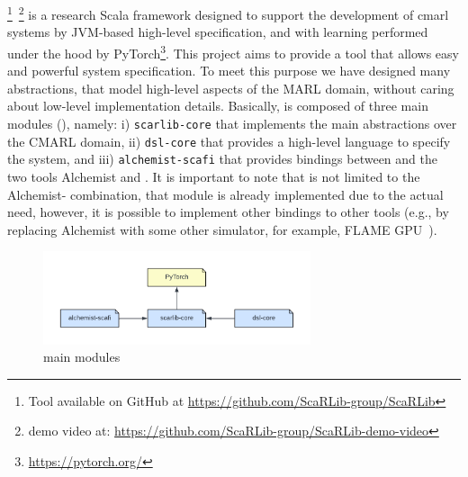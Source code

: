 \section{\scarlib{}}\label{contribution}

\scarlib{} \footnote{Tool available on GitHub at \url{https://github.com/ScaRLib-group/ScaRLib}}~\footnote{demo video at: \url{https://github.com/ScaRLib-group/ScaRLib-demo-video}} is a research Scala framework designed to support
the development of \ac{cmarl} systems by JVM-based high-level specification, and with learning performed under the hood by PyTorch\footnote{\url{https://pytorch.org/}}.
%
This project aims to provide a tool that allows easy and powerful system specification.
%
To meet this purpose we have designed many abstractions, that model high-level aspects of the MARL domain, 
 without caring about low-level implementation details.
Basically, \scarlib{} is composed of three main modules (), namely: 
    i) \texttt{scarlib-core} that implements the main abstractions over the CMARL domain,
    ii) \texttt{dsl-core} that provides a high-level language to specify the system, and
    iii) \texttt{alchemist-scafi} that provides bindings between \scarlib{} and the two tools Alchemist and \scafi{}.
    It is important to note that \scarlib{} is not limited to the Alchemist-\scafi{} combination, that module is 
    already implemented due to the actual need, however, it is possible to implement other bindings to other tools
    (e.g., by replacing Alchemist with some other simulator, for example, FLAME GPU~\cite{flame}).
\begin{figure}[t]
    \centering
    \includegraphics[width=0.7\textwidth]{papers/coordination2023/imgs/scarlib-modules.pdf}
    \caption{\scarlib{} main modules}
    \label{fig:modules}
\end{figure}

